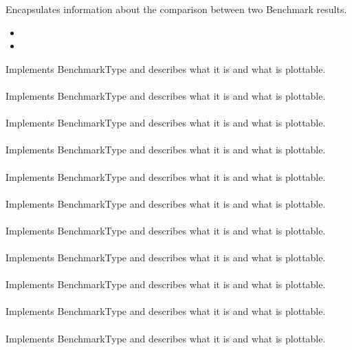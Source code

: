 \label{f:29}
{Encapsulates information about the comparison between two Benchmark results.}
{
  \begin{itemize}
    \item {}
    \item {}
  \end{itemize}
}

\label{f:30}
{Implements BenchmarkType and describes what it is and what is plottable.}
{\\}{\\}
\label{f:31}
{Implements BenchmarkType and describes what it is and what is plottable.}
{\\}{\\}
\label{f:32}
{Implements BenchmarkType and describes what it is and what is plottable.}
{\\}{\\}
\label{f:33}
{Implements BenchmarkType and describes what it is and what is plottable.}
{\\}{\\}
\label{f:34}
{Implements BenchmarkType and describes what it is and what is plottable.}
{\\}{\\}
\label{f:35}
{Implements BenchmarkType and describes what it is and what is plottable.}
{\\}{\\}
\label{f:36}
{Implements BenchmarkType and describes what it is and what is plottable.}
{\\}{\\}
\label{f:37}
{Implements BenchmarkType and describes what it is and what is plottable.}
{\\}{\\}
\label{f:38}
{Implements BenchmarkType and describes what it is and what is plottable.}
{\\}{\\}
\label{f:39}
{Implements BenchmarkType and describes what it is and what is plottable.}
{\\}{\\}
\label{f:40}
{Implements BenchmarkType and describes what it is and what is plottable.}
{\\}{\\}


